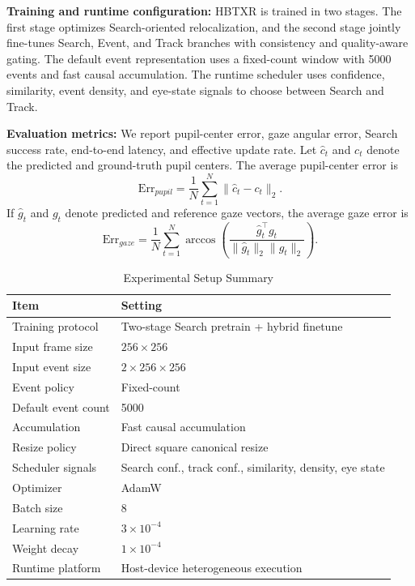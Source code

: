 \documentclass[journal]{IEEEtran}
\begin{document}
\textbf{Training and runtime configuration:} HBTXR is trained in two stages. The first stage optimizes Search-oriented relocalization, and the second stage jointly fine-tunes Search, Event, and Track branches with consistency and quality-aware gating. The default event representation uses a fixed-count window with 5000 events and fast causal accumulation. The runtime scheduler uses confidence, similarity, event density, and eye-state signals to choose between Search and Track.

\textbf{Evaluation metrics:} We report pupil-center error, gaze angular error, Search success rate, end-to-end latency, and effective update rate. Let $\hat c_t$ and $c_t$ denote the predicted and ground-truth pupil centers. The average pupil-center error is
\begin{equation}
\text{Err}_{pupil}=\frac{1}{N}\sum_{t=1}^{N}\|\hat c_t-c_t\|_2.
\end{equation}
If $\hat g_t$ and $g_t$ denote predicted and reference gaze vectors, the average gaze error is
\begin{equation}
\text{Err}_{gaze}=\frac{1}{N}\sum_{t=1}^{N}\arccos\left(\frac{\hat g_t^\top g_t}{\|\hat g_t\|_2\|g_t\|_2}\right).
\end{equation}

\begin{table}[t]
\caption{Experimental Setup Summary}
\label{tab:setup}
\centering
\footnotesize
\begin{tabular}{p{}p{}}
\toprule
Item & Setting \\
\midrule
Training protocol & Two-stage Search pretrain + hybrid finetune \\
Input frame size & $256\times256$ \\
Input event size & $2\times256\times256$ \\
Event policy & Fixed-count \\
Default event count & 5000 \\
Accumulation & Fast causal accumulation \\
Resize policy & Direct square canonical resize \\
Scheduler signals & Search conf., track conf., similarity, density, eye state \\
Optimizer & AdamW \\
Batch size & 8 \\
Learning rate & $3\times10^{-4}$ \\
Weight decay & $1\times10^{-4}$ \\
Runtime platform & Host-device heterogeneous execution \\
\bottomrule
\end{tabular}
\end{table}
\end{document}
